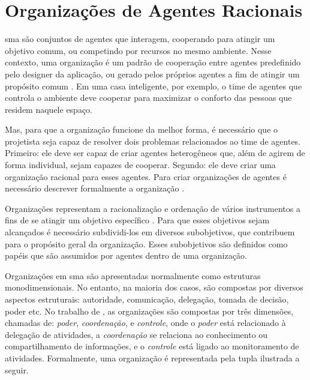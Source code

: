     \section{Organizações de Agentes Racionais}
    \label{sec:agent-org}
        
        \acrfull{sma} são conjuntos de agentes que interagem, cooperando para atingir um objetivo comum, ou competindo por recursos no mesmo ambiente. Nesse contexto, uma organização é um padrão de cooperação entre agentes predefinido pelo designer da aplicação, ou gerado pelos próprios agentes a fim de atingir um propósito comum \cite{boissier2004organization}. Em uma casa inteligente, por exemplo, o time de agentes que controla o ambiente deve cooperar para maximizar o conforto das pessoas que residem naquele espaço. 
        
        Mas, para que a organização funcione da melhor forma, é necessário que o projetista seja capaz de resolver dois problemas relacionados ao time de agentes. Primeiro: ele deve ser capaz de criar agentes heterogêneos que, além de agirem de forma individual, sejam capazes de cooperar. Segundo: ele deve criar uma organização racional para esses agentes. Para criar organizações de agentes é necessário descrever formalmente a organização \cite{francoempirical}.
        
        \label{subsec:org-struct}
        Organizações representam a racionalização e ordenação de vários instrumentos a fins de se atingir um objetivo específico \cite{selznick1948foundations}. Para que esses objetivos sejam alcançados é necessário subdividi-los em diversos subobjetivos, que contribuem para o propósito geral da organização. Esses subobjetivos são definidos como papéis que são assumidos por agentes dentro de uma organização.
        
        Organizações em \acrshort{sma} são apresentadas normalmente como estruturas monodimensionais. No entanto, na maioria dos casos, são compostas por diversos aspectos estruturais: autoridade, comunicação, delegação, tomada de decisão, poder etc. No trabalho de , as organizações são compostas por três dimensões, chamadas de: \emph{poder}, \emph{coordenação}, e \emph{controle}, onde o \emph{poder} está relacionado à delegação de atividades, a \emph{coordenação} se relaciona ao conhecimento ou compartilhamento de informações, e o \emph{controle} está ligado ao monitoramento de atividades. Formalmente, uma organização é representada pela tupla ilustrada a seguir. 
        
